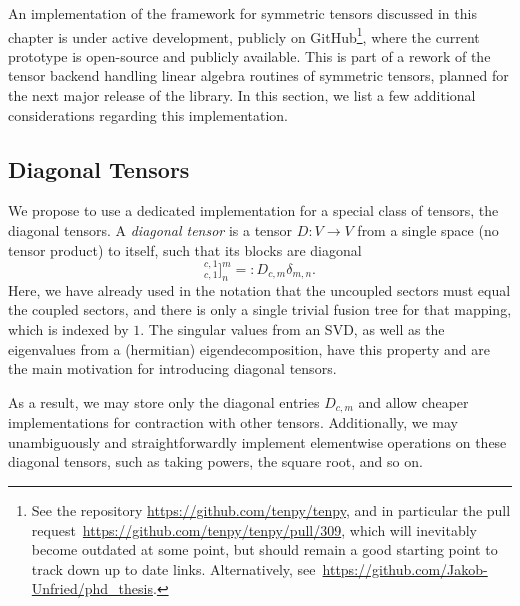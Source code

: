 An implementation of the framework for symmetric tensors discussed in this chapter is under active development, publicly on GitHub\footnote{
    See the repository \url{https://github.com/tenpy/tenpy}, and in particular the pull request~\url{https://github.com/tenpy/tenpy/pull/309}, which will inevitably become outdated at some point, but should remain a good starting point to track down up to date links.
    Alternatively, see~\url{https://github.com/Jakob-Unfried/phd_thesis}.
}, where the current prototype is open-source and publicly available.
%
This is part of a rework of the tensor backend handling linear algebra routines of symmetric tensors, planned for the next major release of the  library.
%
In this section, we list a few additional considerations regarding this implementation.

\subsection{Diagonal Tensors}
We propose to use a dedicated implementation for a special class of tensors, the diagonal tensors.
%
A \emph{diagonal tensor} is a tensor $D: V \to V$ from a single space (no tensor product) to itself,
such that its blocks are diagonal
\begin{equation}
    [[D_c]^{c,1}_{c,1}]^m_n =: D_{c,m} \delta_{m,n}
    .
\end{equation}
%
Here, we have already used in the notation that the uncoupled sectors must equal the coupled sectors, and there is only a single trivial fusion tree for that mapping, which is indexed by $1$.
%
The singular values from an SVD, as well as the eigenvalues from a (hermitian) eigendecomposition, have this property and are the main motivation for introducing diagonal tensors.

As a result, we may store only the diagonal entries $D_{c,m}$ and allow cheaper implementations for contraction with other tensors.
%
Additionally, we may unambiguously and straightforwardly implement elementwise operations on these diagonal tensors, such as taking powers, the square root, and so on.


